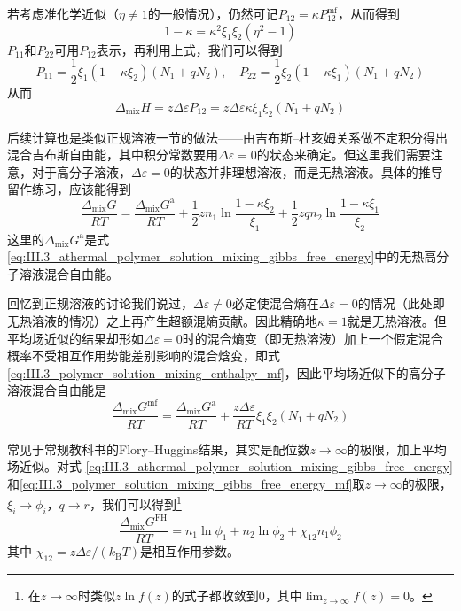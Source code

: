 \documentclass[main.tex]{subfiles}
\begin{document}
若考虑准化学近似（$\eta\neq 1$的一般情况），仍然可记$P_{12}=\kappa P_{12}^\text{mf}$，从而得到
\[1-\kappa=\kappa^2\xi_1\xi_2\left(\eta^2-1\right)\]
$P_{11}$和$P_{22}$可用$P_{12}$表示，再利用上式，我们可以得到
\[P_{11}=\frac{1}{2}\xi_1\left(1-\kappa\xi_2\right)\left(N_1+qN_2\right),\quad P_{22}=\frac{1}{2}\xi_2\left(1-\kappa\xi_1\right)\left(N_1+qN_2\right)\]
从而
\begin{equation}\label{III.3 mixing_enthalpy_with_kappa}
  \Delta_\text{mix}H=z\Delta\varepsilon P_{12}=z\Delta\varepsilon\kappa\xi_1\xi_2\left(N_1+qN_2\right)
\end{equation}

后续计算也是类似正规溶液一节的做法——由吉布斯--杜亥姆关系做不定积分得出混合吉布斯自由能，其中积分常数要用$\Delta\varepsilon=0$的状态来确定。但这里我们需要注意，对于高分子溶液，$\Delta\varepsilon=0$的状态并非理想溶液，而是无热溶液。具体的推导留作练习，应该能得到
\begin{equation}\label{eq:III.3_polymer_solution_mixing_gibbs_free_energy}
  \frac{\Delta_\text{mix}G}{RT} = \frac{\Delta_\text{mix}G^\text{a}}{RT} + \frac{1}{2} z n_1 \ln \frac{1-\kappa\xi_2}{\xi_1} + \frac{1}{2}z q n_2 \ln \frac{1-\kappa\xi_1}{\xi_2}
\end{equation}
这里的$\Delta_\text{mix}G^\text{a}$是式\eqref{eq:III.3_athermal_polymer_solution_mixing_gibbs_free_energy}中的无热高分子溶液混合自由能。

回忆到正规溶液的讨论我们说过，$\Delta\varepsilon\neq 0$必定使混合熵在$\Delta\varepsilon=0$的情况（此处即无热溶液的情况）之上再产生超额混熵贡献。因此精确地$\kappa=1$就是无热溶液。但平均场近似的结果却形如$\Delta\varepsilon=0$时的混合熵变（即无热溶液）加上一个假定混合概率不受相互作用势能差别影响的混合焓变，即式\eqref{eq:III.3_polymer_solution_mixing_enthalpy_mf}，因此平均场近似下的高分子溶液混合自由能是
\begin{equation}
  \label{eq:III.3_polymer_solution_mixing_gibbs_free_energy_mf}
  \frac{\Delta_\text{mix}G^\text{mf}}{RT}=\frac{\Delta_\text{mix}G^\text{a}}{RT}+\frac{z\Delta\varepsilon}{RT}\xi_1\xi_2\left(N_1+qN_2\right)
\end{equation}

常见于常规教科书的Flory--Huggins结果，其实是配位数$z\rightarrow\infty$的极限，加上平均场近似。对式
\eqref{eq:III.3_athermal_polymer_solution_mixing_gibbs_free_energy}和\eqref{eq:III.3_polymer_solution_mixing_gibbs_free_energy_mf}取$z\to\infty$的极限，$\xi_i\to \phi_i$，$q\to r$，我们可以得到\footnote{在$z\to\infty$时类似$z\ln f\left(z\right)$的式子都收敛到0，其中$\lim_{z\to\infty}f\left(z\right)=0$。}
\begin{equation}\label{eq:III.3_polymer_solution_mixing_gibbs_free_energy_flory_huggins}
  \frac{\Delta_\text{mix}G^\text{FH}}{RT}=n_1\ln\phi_1+n_2\ln\phi_2+\chi_{12}n_1\phi_2
\end{equation}
其中
$\chi_{12}=z\Delta\varepsilon/\left(k_\text{B}T\right)$是相互作用参数。
\end{document}
